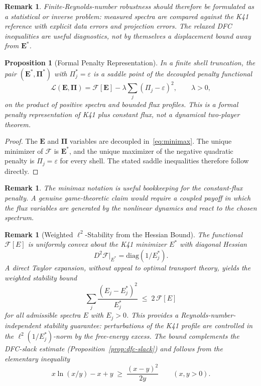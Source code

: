 \documentclass[12pt,a4paper]{article}
\theoremstyle{breakdef}
\theoremstyle{breakplain}
\newtheorem{proposition}[definition]{Proposition}
\theoremstyle{breakdef}
\newtheorem{remark}[definition]{Remark}
\begin{document}
\begin{remark}
Finite-Reynolds-number robustness should therefore be formulated as a
statistical or inverse problem: measured spectra are compared against the
K41 reference with explicit data errors and projection errors. The relaxed
DFC inequalities are useful diagnostics, not by themselves a displacement
bound away from $\mathbf{E}^*$.
\end{remark}

\begin{proposition}[Formal Penalty Representation]
\label{prop:minimax}
In a finite shell truncation, the pair
$(\mathbf{E}^*,\boldsymbol{\Pi}^*)$ with
$\Pi_j^*=\varepsilon$ is a saddle point of the decoupled penalty functional
\begin{equation}\label{eq:minimax}
  \mathcal{L}(\mathbf{E},\boldsymbol{\Pi})
  =
  \mathcal{F}[\mathbf{E}]
  -
  \lambda\sum_j(\Pi_j-\varepsilon)^2,
  \qquad \lambda>0,
\end{equation}
on the product of positive spectra and bounded flux profiles. This is a
formal penalty representation of K41 plus constant flux, not a dynamical
two-player theorem.
\end{proposition}

\begin{proof}
The $\mathbf{E}$ and $\boldsymbol{\Pi}$ variables are decoupled in~\eqref{eq:minimax}. The unique minimizer of $\mathcal{F}$ is
$\mathbf{E}^*$, and the unique maximizer of the negative quadratic penalty
is $\Pi_j=\varepsilon$ for every shell. The stated saddle inequalities
therefore follow directly.
\end{proof}

\begin{remark}
The minimax notation is useful bookkeeping for the constant-flux penalty.
A genuine game-theoretic claim would require a coupled payoff in which the
flux variables are generated by the nonlinear dynamics and react to the
chosen spectrum.
\end{remark}

\begin{remark}[Weighted $\ell^2$-Stability from the Hessian Bound]
\label{rem:talagrand}
The functional $\mathcal{F}[E]$ is uniformly convex about the K41 minimizer
$E^*$ with diagonal Hessian
\[
  D^2\mathcal{F}\big|_{E^*} = \mathrm{diag}(1/E_j^*).
\]
A direct Taylor expansion, without appeal to optimal transport theory,
yields the weighted stability bound
\[
  \sum_j \frac{(E_j - E_j^*)^2}{E_j^*} \;\le\; 2\,\mathcal{F}[E]
\]
for all admissible spectra $E$ with $E_j > 0$. This provides a
Reynolds-number-independent stability guarantee: perturbations of the K41
profile are controlled in the $\ell^2(1/E_j^*)$-norm by the free-energy
excess. The bound complements the DFC-slack estimate
(Proposition~\ref{prop:dfc-slack}) and follows from the elementary
inequality
\[
  x\ln(x/y) - x + y \;\ge\; \frac{(x-y)^2}{2y}
  \qquad (x,y>0).
\]
\end{remark}
\end{document}
